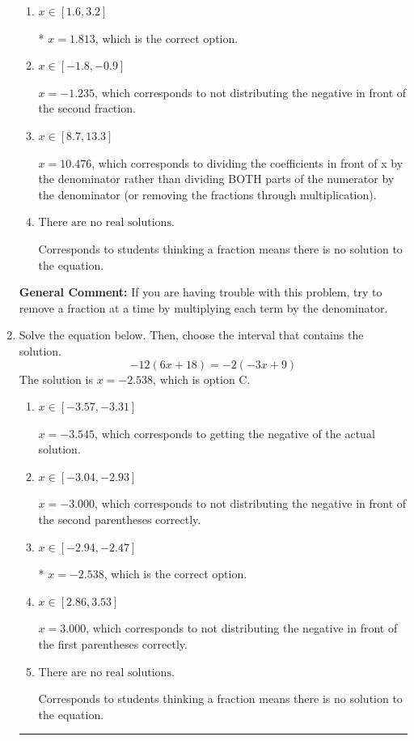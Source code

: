 \documentclass{extbook}[14pt]
\newcommand{\litem}[1]{\item #1

\rule{\textwidth}{0.4pt}}
\begin{document}
\begin{enumerate}
{\begin{enumerate}[label=\Alph*.]
 $x = 0.381$, which corresponds to dividing the second number in the numerator by the denominator rather than dividing BOTH parts of the numerator by the denominator (or removing the fractions through multiplication).
\item \( x \in [1.6, 3.2] \)

* $x = 1.813$, which is the correct option.
\item \( x \in [-1.8, -0.9] \)

 $x = -1.235$, which corresponds to not distributing the negative in front of the second fraction.
\item \( x \in [8.7, 13.3] \)

 $x = 10.476$, which corresponds to dividing the coefficients in front of x by the denominator rather than dividing BOTH parts of the numerator by the denominator (or removing the fractions through multiplication).
\item \( \text{There are no real solutions.} \)

Corresponds to students thinking a fraction means there is no solution to the equation.
\end{enumerate}

\textbf{General Comment:} If you are having trouble with this problem, try to remove a fraction at a time by multiplying each term by the denominator.
}
\litem{
Solve the equation below. Then, choose the interval that contains the solution.
\[ -12(6x + 18) = -2(-3x + 9) \]The solution is \( x = -2.538 \), which is option C.\begin{enumerate}[label=\Alph*.]
\item \( x \in [-3.57, -3.31] \)

$x = -3.545$, which corresponds to getting the negative of the actual solution.
\item \( x \in [-3.04, -2.93] \)

$x = -3.000$, which corresponds to not distributing the negative in front of the second parentheses correctly.
\item \( x \in [-2.94, -2.47] \)

* $x = -2.538$, which is the correct option.
\item \( x \in [2.86, 3.53] \)

$x = 3.000$, which corresponds to not distributing the negative in front of the first parentheses correctly.
\item \( \text{There are no real solutions.} \)

Corresponds to students thinking a fraction means there is no solution to the equation.
\end{enumerate}

}
\end{enumerate}
\end{document}
